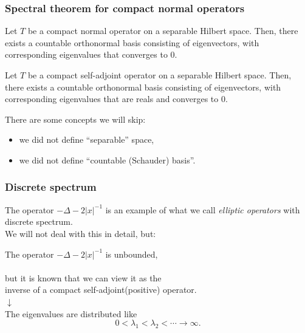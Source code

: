 \documentclass[10pt]{beamer}
\begin{document}
\begin{frame}
\frametitle{Spectral theorem for compact normal operators}
  \begin{thm}
    Let $T$ be a compact normal operator on a separable Hilbert space. Then, there exists a countable orthonormal basis consisting of eigenvectors, with corresponding eigenvalues that converges to 0.
  \end{thm}
  \begin{thm}
    Let $T$ be a compact self-adjoint operator on a separable Hilbert space. Then, there exists a countable orthonormal basis consisting of eigenvectors, with corresponding eigenvalues that are reals and converges to 0.
  \end{thm}
  \pause
  \begin{rmk}
    There are some concepts we will skip:
    \begin{itemize}
      \item we did not define ``separable'' space,
      \item we did not define ``countable (Schauder) basis''.
    \end{itemize}
  \end{rmk}
\end{frame}

\begin{frame}
\frametitle{Discrete spectrum}
  The operator $-\Delta-2|x|^{-1}$ is an example of what we call \emph{elliptic operators} with discrete spectrum.\\
  We will not deal with this in detail, but:
  \bigskip
  \begin{center}
    \pause The operator $-\Delta-2|x|^{-1}$ is unbounded,\\$\ $\\
    \pause but it is known that we can view it as the\\
    inverse of a compact self-adjoint(positive) operator.\\
    \pause $\downarrow$ \\
    The eigenvalues are distributed like
    \[0<\lambda_1<\lambda_2<\cdots\to\infty.\]
  \end{center}
\end{frame}
\end{document}
